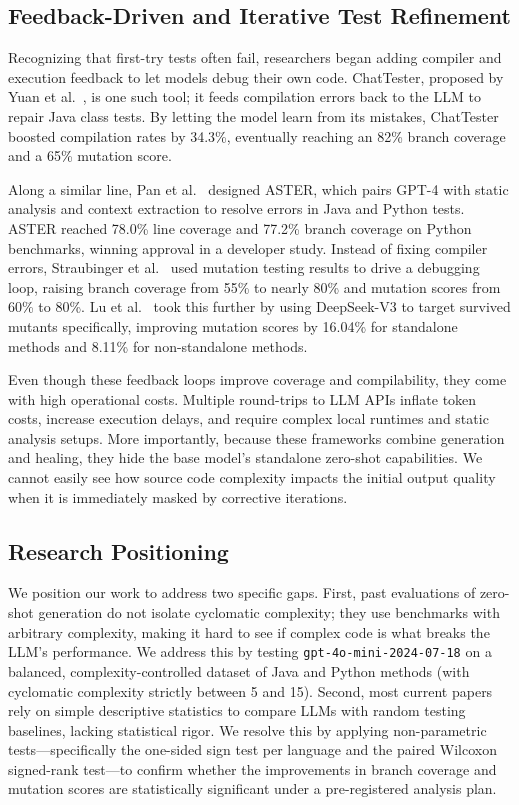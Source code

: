\subsection{Feedback-Driven and Iterative Test Refinement}
\label{subsec:iterative_refinement}

Recognizing that first-try tests often fail, researchers began adding compiler and execution feedback to let models debug their own code. ChatTester, proposed by Yuan et al.~\cite{yuan2024chattester}, is one such tool; it feeds compilation errors back to the LLM to repair Java class tests. By letting the model learn from its mistakes, ChatTester boosted compilation rates by 34.3\%, eventually reaching an 82\% branch coverage and a 65\% mutation score.

Along a similar line, Pan et al.~\cite{pan2024aster} designed ASTER, which pairs GPT-4 with static analysis and context extraction to resolve errors in Java and Python tests. ASTER reached 78.0\% line coverage and 77.2\% branch coverage on Python benchmarks, winning approval in a developer study. Instead of fixing compiler errors, Straubinger et al.~\cite{straubinger2025mutation} used mutation testing results to drive a debugging loop, raising branch coverage from 55\% to nearly 80\% and mutation scores from 60\% to 80\%. Lu et al.~\cite{lu2026beyond} took this further by using DeepSeek-V3 to target survived mutants specifically, improving mutation scores by 16.04\% for standalone methods and 8.11\% for non-standalone methods.

Even though these feedback loops improve coverage and compilability, they come with high operational costs. Multiple round-trips to LLM APIs inflate token costs, increase execution delays, and require complex local runtimes and static analysis setups. More importantly, because these frameworks combine generation and healing, they hide the base model's standalone zero-shot capabilities. We cannot easily see how source code complexity impacts the initial output quality when it is immediately masked by corrective iterations.

\subsection{Research Positioning}
\label{subsec:positioning}

We position our work to address two specific gaps. First, past evaluations of zero-shot generation do not isolate cyclomatic complexity; they use benchmarks with arbitrary complexity, making it hard to see if complex code is what breaks the LLM's performance. We address this by testing \texttt{gpt-4o-mini-2024-07-18} on a balanced, complexity-controlled dataset of Java and Python methods (with cyclomatic complexity strictly between 5 and 15). Second, most current papers rely on simple descriptive statistics to compare LLMs with random testing baselines, lacking statistical rigor. We resolve this by applying non-parametric tests---specifically the one-sided sign test per language and the paired Wilcoxon signed-rank test---to confirm whether the improvements in branch coverage and mutation scores are statistically significant under a pre-registered analysis plan.

